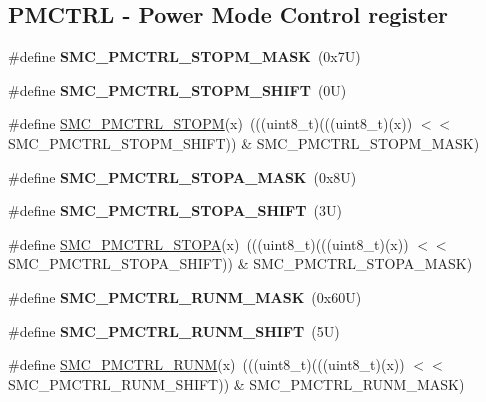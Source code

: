 \subsection*{P\+M\+C\+T\+RL -\/ Power Mode Control register}
\begin{DoxyCompactItemize}
\item 
\mbox{\label{group___s_m_c___register___masks_ga8df79d8a16a6d12e3b343eec59d9453c}} 
\#define {\bfseries S\+M\+C\+\_\+\+P\+M\+C\+T\+R\+L\+\_\+\+S\+T\+O\+P\+M\+\_\+\+M\+A\+SK}~(0x7\+U)
\item 
\mbox{\label{group___s_m_c___register___masks_gaac7423086f31a8fbbfc8d18b1a876f26}} 
\#define {\bfseries S\+M\+C\+\_\+\+P\+M\+C\+T\+R\+L\+\_\+\+S\+T\+O\+P\+M\+\_\+\+S\+H\+I\+FT}~(0\+U)
\item 
\#define \mbox{\hyperlink{group___s_m_c___register___masks_gaa2ea36f819a21ef6b513564dc1453958}{S\+M\+C\+\_\+\+P\+M\+C\+T\+R\+L\+\_\+\+S\+T\+O\+PM}}(x)~(((uint8\+\_\+t)(((uint8\+\_\+t)(x)) $<$$<$ S\+M\+C\+\_\+\+P\+M\+C\+T\+R\+L\+\_\+\+S\+T\+O\+P\+M\+\_\+\+S\+H\+I\+FT)) \& S\+M\+C\+\_\+\+P\+M\+C\+T\+R\+L\+\_\+\+S\+T\+O\+P\+M\+\_\+\+M\+A\+SK)
\item 
\mbox{\label{group___s_m_c___register___masks_gadd72ad662b62a7b51225b529fef2c77a}} 
\#define {\bfseries S\+M\+C\+\_\+\+P\+M\+C\+T\+R\+L\+\_\+\+S\+T\+O\+P\+A\+\_\+\+M\+A\+SK}~(0x8\+U)
\item 
\mbox{\label{group___s_m_c___register___masks_gadfe89210f121f10b74f2fba55f059e1d}} 
\#define {\bfseries S\+M\+C\+\_\+\+P\+M\+C\+T\+R\+L\+\_\+\+S\+T\+O\+P\+A\+\_\+\+S\+H\+I\+FT}~(3\+U)
\item 
\#define \mbox{\hyperlink{group___s_m_c___register___masks_gaf2a78629f2034b26e237c45e889e122e}{S\+M\+C\+\_\+\+P\+M\+C\+T\+R\+L\+\_\+\+S\+T\+O\+PA}}(x)~(((uint8\+\_\+t)(((uint8\+\_\+t)(x)) $<$$<$ S\+M\+C\+\_\+\+P\+M\+C\+T\+R\+L\+\_\+\+S\+T\+O\+P\+A\+\_\+\+S\+H\+I\+FT)) \& S\+M\+C\+\_\+\+P\+M\+C\+T\+R\+L\+\_\+\+S\+T\+O\+P\+A\+\_\+\+M\+A\+SK)
\item 
\mbox{\label{group___s_m_c___register___masks_ga1a456925e291d6d53f4891b25fcaf8eb}} 
\#define {\bfseries S\+M\+C\+\_\+\+P\+M\+C\+T\+R\+L\+\_\+\+R\+U\+N\+M\+\_\+\+M\+A\+SK}~(0x60\+U)
\item 
\mbox{\label{group___s_m_c___register___masks_ga8f8dc472f4a4b6ad1babae518c44d55e}} 
\#define {\bfseries S\+M\+C\+\_\+\+P\+M\+C\+T\+R\+L\+\_\+\+R\+U\+N\+M\+\_\+\+S\+H\+I\+FT}~(5\+U)
\item 
\#define \mbox{\hyperlink{group___s_m_c___register___masks_gaa375b91daca0dd7f4b1452da903b5bdc}{S\+M\+C\+\_\+\+P\+M\+C\+T\+R\+L\+\_\+\+R\+U\+NM}}(x)~(((uint8\+\_\+t)(((uint8\+\_\+t)(x)) $<$$<$ S\+M\+C\+\_\+\+P\+M\+C\+T\+R\+L\+\_\+\+R\+U\+N\+M\+\_\+\+S\+H\+I\+FT)) \& S\+M\+C\+\_\+\+P\+M\+C\+T\+R\+L\+\_\+\+R\+U\+N\+M\+\_\+\+M\+A\+SK)
\end{DoxyCompactItemize}
